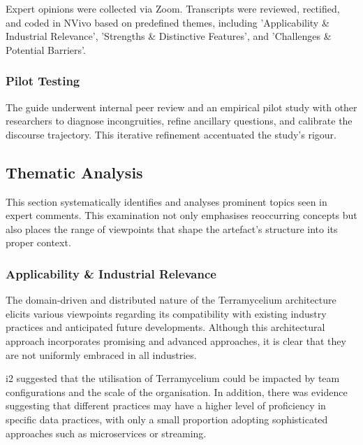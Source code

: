 \documentclass{ieeeaccess}
\begin{document}
    

  

  Expert opinions were collected via Zoom. Transcripts were reviewed, rectified, and coded in NVivo based on predefined themes, including 'Applicability \& Industrial Relevance', 'Strengths \& Distinctive Features', and 'Challenges \& Potential Barriers'.

  

  \subsubsection{Pilot Testing}

  

  The guide underwent internal peer review and an empirical pilot study with other researchers to diagnose incongruities, refine ancillary questions, and calibrate the discourse trajectory. This iterative refinement accentuated the study's rigour.

\subsection{Thematic Analysis} \label{expertOpinion_thematicAnalysis}

This section systematically identifies and analyses prominent topics seen in expert comments. This examination not only emphasises reoccurring concepts but also places the range of viewpoints that shape the artefact's structure into its proper context.

\subsubsection{Applicability \& Industrial Relevance}

The domain-driven and distributed nature of the Terramycelium architecture elicits various viewpoints regarding its compatibility with existing industry practices and anticipated future developments. Although this architectural approach incorporates promising and advanced approaches, it is clear that they are not uniformly embraced in all industries.

i2 suggested that the utilisation of Terramycelium could be impacted by team configurations and the scale of the organisation. In addition, there was evidence suggesting that different practices may have a higher level of proficiency in specific data practices, with only a small proportion adopting sophisticated approaches such as microservices or streaming.
\end{document}
